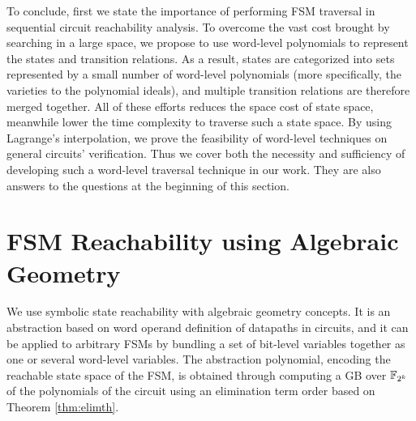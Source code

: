 To conclude, first we state the importance of performing FSM traversal in sequential circuit reachability analysis.
To overcome the vast cost brought by searching in a large space, we propose to use word-level 
polynomials to represent the states and transition relations. As a result, states are categorized into 
sets represented by a small number of word-level polynomials (more specifically, the varieties to the polynomial ideals),
and multiple transition relations are therefore merged together. All of these efforts reduces the space cost of 
state space, meanwhile lower the time complexity to traverse such a state space. By using Lagrange's interpolation,
we prove the feasibility of word-level techniques on general circuits' verification.
Thus we cover both the necessity and sufficiency of developing such 
a word-level traversal technique in our work.
They are also answers to the questions at the beginning of this section.

\section{FSM Reachability using Algebraic Geometry}
\label{sec:reach}
We use symbolic state reachability with algebraic
geometry concepts. It is an abstraction based on word operand
definition of datapaths in circuits, and it can be applied
to arbitrary FSMs by bundling a set of bit-level variables together as
one or several word-level variables.  The abstraction polynomial,
encoding the reachable state space of the FSM, is obtained through
computing a GB over ${\mathbb{F}}_{2^k}$ of the polynomials of the circuit using an
elimination term order based on Theorem \ref{thm:elimth}.  

